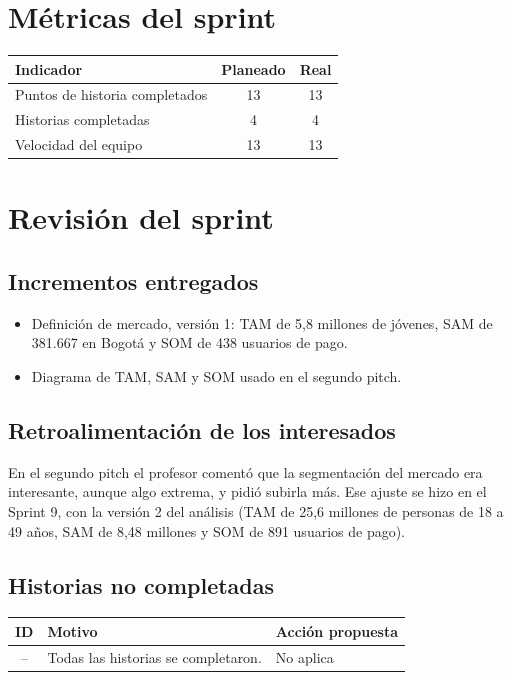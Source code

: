 \documentclass[11pt,a4paper]{article}
\begin{document}
\section{Métricas del sprint}

\begin{tabularx}{\textwidth}{X c c}
  \toprule
  \textbf{Indicador} & \textbf{Planeado} & \textbf{Real} \\
  \midrule
  Puntos de historia completados & 13 & 13 \\
  Historias completadas          & 4 & 4 \\
  Velocidad del equipo           & 13 & 13 \\
  \bottomrule
\end{tabularx}

\section{Revisión del sprint}

\subsection{Incrementos entregados}
\begin{itemize}[leftmargin=1.5em]
  \item {Definición de mercado, versión 1: TAM de 5,8 millones de jóvenes, SAM de 381.667 en Bogotá y SOM de 438 usuarios de pago.}
  \item {Diagrama de TAM, SAM y SOM usado en el segundo pitch.}
\end{itemize}

\subsection{Retroalimentación de los interesados}
{En el segundo pitch el profesor comentó que la segmentación del mercado era interesante, aunque algo extrema, y pidió subirla más. Ese ajuste se hizo en el Sprint 9, con la versión 2 del análisis (TAM de 25,6 millones de personas de 18 a 49 años, SAM de 8,48 millones y SOM de 891 usuarios de pago).}

\subsection{Historias no completadas}
\begin{tabularx}{\textwidth}{c X X}
  \toprule
  \textbf{ID} & \textbf{Motivo} & \textbf{Acción propuesta} \\
  \midrule
  -- & Todas las historias se completaron. & No aplica \\
  \bottomrule
\end{tabularx}
\end{document}
